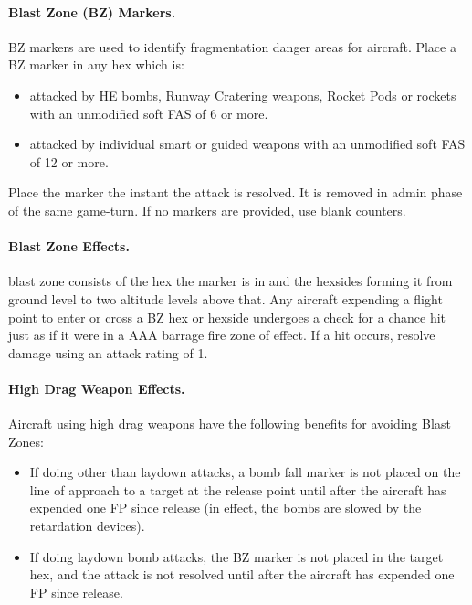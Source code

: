 \begin{advancedrules}
\paragraph{Blast Zone (BZ) Markers.} BZ markers are used to identify fragmentation danger areas for aircraft. Place a BZ marker in any hex which is:

\begin{itemize}
    \item attacked by HE bombs, Runway Cratering weapons, Rocket Pods or rockets with an unmodified soft FAS of 6 or more.

    \item attacked by individual smart or guided weapons with an unmodified soft FAS of 12 or more.
\end{itemize}

Place the marker the instant the attack is resolved. It is removed in admin phase of the same game-turn. If no markers are provided, use blank counters.

\paragraph{Blast Zone Effects.}  blast zone consists of the hex the marker is in and the hexsides forming it from ground level to two altitude levels above that. Any aircraft expending a flight point to enter or cross a BZ hex or hexside undergoes a check for a chance hit just as if it were in a AAA barrage fire zone of effect. If a hit occurs, resolve damage using an attack rating of 1.

\paragraph{High Drag Weapon Effects.} Aircraft using high drag weapons have the following benefits for avoiding Blast Zones:

\begin{itemize}
    \item If doing other than laydown attacks, a bomb fall marker is not placed on the line of approach to a target at the release point until after the aircraft has expended one FP since release (in effect, the bombs are slowed by the retardation devices).

    \item If doing laydown bomb attacks, the BZ marker is not placed in the target hex, and the attack is not resolved until after the aircraft has expended one FP since release.
\end{itemize}

\end{advancedrules}
